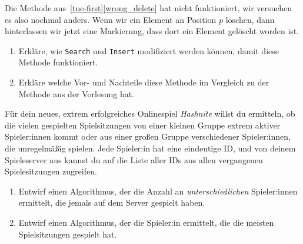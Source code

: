\documentclass{uebung_cs}
\begin{document}
\begin{aufgabe}
	Die Methode aus~\ref{tue-first}\ref{wrong_delete} hat nicht funktioniert, wir versuchen es also nochmal anders.
	Wenn wir ein Element an Position $p$ löschen, dann hinterlassen wir jetzt eine Markierung, dass dort ein Element gelöscht worden ist.
	\begin{enumerate}
		\item Erkläre, wie \texttt{Search} und \texttt{Insert} modifiziert werden können, damit diese Methode funktioniert.
		\item Erkläre welche Vor- und Nachteile diese Methode im Vergleich zu der Methode aus der Vorlesung hat.
	\end{enumerate}
\end{aufgabe}

\begin{aufgabe}
	Für dein neues, extrem erfolgreiches Onlinespiel \emph{Hashnite} willst du ermitteln, ob die vielen gespielten Spielsitzungen von einer kleinen Gruppe extrem aktiver Spieler:innen kommt oder aus einer großen Gruppe verschiedener Spieler:innen, die unregelmäßig spielen.
	Jede Spieler:in hat eine eindeutige ID, und von deinem Spieleserver aus kannst du auf die Liste aller IDs aus allen vergangenen Spielesitzungen zugreifen.
	\begin{enumerate}
		\item Entwirf einen Algorithmus, der die Anzahl an \emph{unterschiedlichen} Spieler:innen ermittelt, die jemals auf dem Server gespielt haben.
		\item Entwirf einen Algorithmus, der die Spieler:in ermittelt, die die meisten Spielsitzungen gespielt hat.
	\end{enumerate}
\end{aufgabe}
\end{document}
